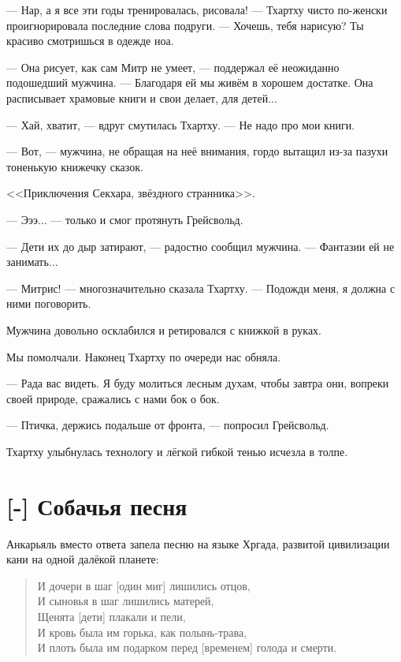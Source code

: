 --- Нар, а я все эти годы тренировалась, рисовала! --- Тхартху чисто по-женски проигнорировала последние слова подруги.
--- Хочешь, тебя нарисую?
Ты красиво смотришься в одежде ноа.

--- Она рисует, как сам Митр не умеет, --- поддержал её неожиданно подошедший мужчина.
--- Благодаря ей мы живём в хорошем достатке.
Она расписывает храмовые книги и свои делает, для детей...

--- Хай, хватит, --- вдруг смутилась Тхартху.
--- Не надо про мои книги.

--- Вот, --- мужчина, не обращая на неё внимания, гордо вытащил из-за пазухи тоненькую книжечку сказок.

<<Приключения Секхара, звёздного странника>>.

--- Эээ... --- только и смог протянуть Грейсвольд.

--- Дети их до дыр затирают, --- радостно сообщил мужчина.
--- Фантазии ей не занимать...

--- Митрис! --- многозначительно сказала Тхартху.
--- Подожди меня, я должна с ними поговорить.

Мужчина довольно осклабился и ретировался с книжкой в руках.

Мы помолчали.
Наконец Тхартху по очереди нас обняла.

--- Рада вас видеть.
Я буду молиться лесным духам, чтобы завтра они, вопреки своей природе, сражались с нами бок о бок.

--- Птичка, держись подальше от фронта, --- попросил Грейсвольд.

Тхартху улыбнулась технологу и лёгкой гибкой тенью исчезла в толпе.

\section{[-] Собачья песня}

\textspace

Анкарьяль вместо ответа запела песню на языке Хргада, развитой цивилизации кани на одной далёкой планете:

\begin{verse}
И дочери в шаг [один миг] лишились отцов,\\
И сыновья в шаг лишились матерей,\\
Щенята [дети] плакали и пели,\\
И кровь была им горька, как полынь-трава,\\
И плоть была им подарком перед [временем] голода и смерти\FM.\\
\end{verse}

